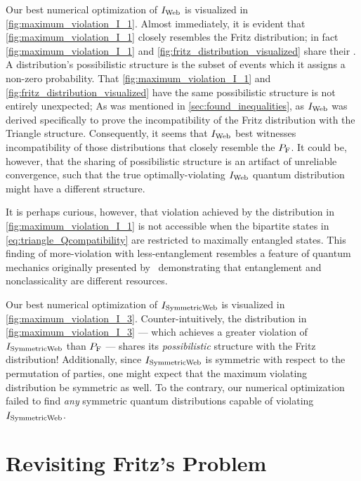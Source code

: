 \documentclass[aps, 10pt, english, twoside, pra, nofootinbib, tightenlines, longbibliography, superscriptaddress]{revtex4-1}
\begin{document}
    Our best numerical optimization of $I_\text{Web}$ is visualized in \cref{fig:maximum_violation_I_1}. Almost immediately, it is evident that \cref{fig:maximum_violation_I_1} closely resembles the Fritz distribution; in fact \cref{fig:maximum_violation_I_1} and \cref{fig:fritz_distribution_visualized} share their . A distribution's possibilistic structure is the subset of events which it assigns a non-zero probability. That \cref{fig:maximum_violation_I_1} and \cref{fig:fritz_distribution_visualized} have the same possibilistic structure is not entirely unexpected;  As was mentioned in \cref{sec:found_inequalities}, as $I_\text{Web}$ was derived specifically to prove the incompatibility of the Fritz distribution with the Triangle structure. Consequently, it seems that $I_\text{Web}$ best witnesses incompatibility of those distributions that closely resemble the $\prob[\fritz]$. It could be, however, that the sharing of possibilistic structure is an artifact of unreliable convergence, such that the true optimally-violating $I_\text{Web}$ quantum distribution might have a different structure.

    It is perhaps curious, however, that violation achieved by the distribution in \cref{fig:maximum_violation_I_1} is not accessible when the bipartite states in \cref{eq:triangle_Qcompatibility} are restricted to maximally entangled states. This finding of more-violation with less-entanglement resembles a feature of quantum mechanics originally presented by~\citet{Methot_2006} demonstrating that entanglement and nonclassicality are different resources.

    Our best numerical optimization of $I_\text{SymmetricWeb}$ is visualized in \cref{fig:maximum_violation_I_3}. Counter-intuitively, the distribution in \cref{fig:maximum_violation_I_3} --- which achieves a greater violation of $I_\text{SymmetricWeb}$ than $\prob[\fritz]$ --- shares its \textit{possibilistic} structure with the Fritz distribution! Additionally, since $I_\text{SymmetricWeb}$ is symmetric with respect to the permutation of parties, one might expect that the maximum violating distribution be symmetric as well. To the contrary, our numerical optimization failed to find \emph{any} symmetric quantum distributions capable of violating $I_\text{SymmetricWeb}$.

    \section{Revisiting Fritz's Problem}
    \label{sec:fritz_problem_revisit}
\end{document}
